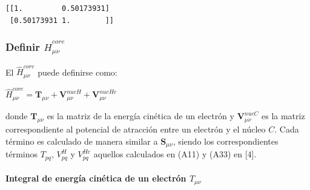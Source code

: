 \documentclass[
  letterpaper,
  DIV=11,
  numbers=noendperiod]{scrreprt}
\let\oldparagraph\paragraph
\renewcommand{\paragraph}[1]{\oldparagraph{#1}\mbox{}}
\begin{document}
\begin{verbatim}
[[1.         0.50173931]
 [0.50173931 1.        ]]
\end{verbatim}

\hypertarget{definir-hathcore_mu-nu}{%
\subsubsection{\texorpdfstring{Definir
\(\hat{H}^{core}_{\mu \nu}\)}{Definir \textbackslash hat\{H\}\^{}\{core\}\_\{\textbackslash mu \textbackslash nu\}}}\label{definir-hathcore_mu-nu}}

El \(\hat{H}^{core}_{\mu \nu}\) puede definirse como:

\(\hat{H}^{core}_{\mu \nu} = \textbf{T}_{\mu \nu} + \textbf{V}^{nucH}_{\mu \nu} + \textbf{V}^{nucHe}_{\mu \nu}\)

donde \(\textbf{T}_{\mu \nu}\) es la matriz de la energía cinética de un
electrón y \(\textbf{V}^{nucC}_{\mu \nu}\) es la matriz correspondiente
al potencial de atracción entre un electrón y el núcleo \(C\). Cada
término es calculado de manera similar a \(\mathbf{S}_{\mu \nu}\),
siendo los correspondientes términos \(T_{pq}\), \(V^H_{pq}\) y
\(V^{He}_{pq}\) aquellos calculados en (A11) y (A33) en {[}4{]}.

\hypertarget{integral-de-energuxeda-cinuxe9tica-de-un-electruxf3n-t_mu-nu}{%
\paragraph{\texorpdfstring{Integral de energía cinética de un electrón
\(T_{\mu \nu}\)}{Integral de energía cinética de un electrón T\_\{\textbackslash mu \textbackslash nu\}}}\label{integral-de-energuxeda-cinuxe9tica-de-un-electruxf3n-t_mu-nu}}
\end{document}
